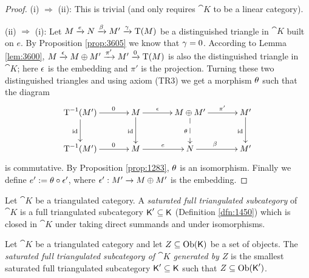 \begin{proof} \mbox{}

\smallskip \noindent 
(i) $\Rightarrow$ (ii): This is trivial (and only requires $\cat{K}$ to be a 
linear category). 

\medskip \noindent 
(ii) $\Rightarrow$ (i): Let 
$M \xrightarrow{e} N \xrightarrow{\beta} M' \xrightarrow{\gamma} \operatorname{T}(M)$
be a distinguished triangle in $\cat{K}$ built on $e$. By Proposition 
\ref{prop:3605} we know that $\gamma = 0$. According to Lemma \ref{lem:3600},
$M \xrightarrow{\epsilon} M \oplus M' \xrightarrow{\pi'} M' \xrightarrow{0} \operatorname{T}(M)$
is also the distinguished triangle in $\cat{K}$;
here $\epsilon$ is the embedding and $\pi'$ is the projection. 
Turning these two distinguished triangles and using axiom (TR3) we get a 
morphism $\theta$ such that the diagram 
\[ \UseTips  \xymatrix @C=8ex @R=6ex {
\opn{T}^{-1}(M') 
\ar[r]^(0.6){0}
\ar[d]_{\opn{id}}
&
M 
\ar[r]^(0.4){\ep}
\ar[d]_{\opn{id}}
&
M \oplus M'
\ar[r]^(0.58){\pi'}
\ar@{-->}[d]_{\th}
& 
M'
\ar[d]_{\opn{id}}
\\
\opn{T}^{-1}(M') 
\ar[r]^(0.6){0}
&
M
\ar[r]^(0.5){e}
& 
N 
\ar[r]^(0.45){\be}
&
M'
} \]
is commutative. By Proposition \ref{prop:1283}, $\theta$ is an isomorphism. 
Finally we define $e' := \theta \circ \epsilon'$, where 
$\epsilon' : M' \to M \oplus M'$ is the embedding. 
\end{proof}

\begin{dfn} \label{dfn:4915}
Let $\cat{K}$ be a triangulated category. A {\em saturated full triangulated 
subcategory} of $\cat{K}$ is a full triangulated subcategory 
$\operatorname{\mathsf{K}}' \subseteq \operatorname{\mathsf{K}}$ (Definition \ref{dfn:1450}) which is closed in $\cat{K}$
under taking direct summands and under isomorphisms. 
\end{dfn}

\begin{dfn} \label{dfn:4916}
Let $\cat{K}$ be a triangulated category and let $Z \subseteq \operatorname{Ob}(\operatorname{\mathsf{K}})$ be 
a set of objects. The {\em saturated full triangulated subcategory of $\cat{K}$
generated by $Z$} is the smallest saturated full triangulated subcategory 
$\operatorname{\mathsf{K}}' \subseteq \operatorname{\mathsf{K}}$ such that $Z \subseteq \operatorname{Ob}(\operatorname{\mathsf{K}}')$.
\end{dfn}

